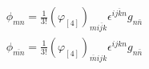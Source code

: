 \begin{equation}
\begin{array}{ll}
\phi_{mn}=\frac{1}{3!}(\varphi_{[4]})_{m\overline{ijk}}\epsilon^{\overline{ijkn}}g_{n \bar n}\\
\phi_{\overline{mn}}=\frac{1}{3!}(\varphi_{[4]})_{\overline{m}ijk}\epsilon^{ijkn}g_{n \bar n}
\end{array}
\end{equation}


